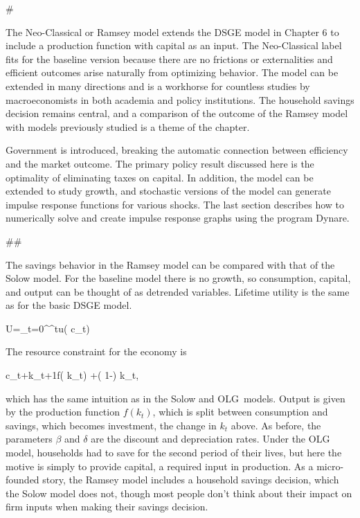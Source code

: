 ﻿\documentclass[oneside]{book}
\begin{document}
#



The Neo-Classical or Ramsey model extends the DSGE model in Chapter 6 to include a production function with capital as an input. The Neo-Classical label fits for the baseline version because there are no frictions or
externalities and efficient outcomes arise naturally from optimizing behavior. The model can be extended in many directions and is a workhorse
for countless studies by macroeconomists in both academia and policy institutions. The household savings decision remains central, and a comparison of the outcome of the Ramsey model with models previously studied is a theme of the chapter.

Government is introduced, breaking the automatic connection between efficiency and the market outcome. The primary policy result discussed here is the optimality of eliminating taxes on capital. In addition, the
model can be extended to study growth, and stochastic versions of the model can generate impulse response functions for various shocks.
The last section describes how to numerically solve and create impulse response graphs using the program Dynare.



##



The savings behavior in the Ramsey model can be compared with that of the Solow model. For the baseline model there is no growth, so consumption, capital, and output can be thought of as detrended variables. Lifetime utility is the
same as for the basic DSGE model.



U=\sum_{t=0}^{\infty }\beta ^{t}u( c_{t})


The resource constraint for the economy is



c_{t}+k_{t+1}\leq f( k_{t}) +( 1-\delta ) k_{t},


which has the same intuition as in the Solow and OLG\ models. Output is given by the production function $f( k_{t}) $, which is split between consumption and savings, which becomes investment, the change in $k_{t}$ above. As before, the parameters $\beta $ and $\delta $ are the discount and depreciation rates. Under the OLG model, households had to save for the second period of their lives, but here the motive is simply to provide capital, a required input in production. As a micro-founded
story, the Ramsey model includes a household savings decision, which the Solow model does not, though most people don't think about their impact on firm inputs when making their savings decision.
\end{document}
